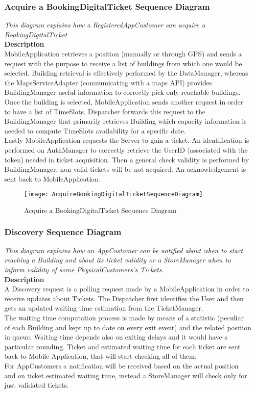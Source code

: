 \subsubsection{Acquire a BookingDigitalTicket Sequence Diagram}
\textit{This diagram explains how a RegisteredAppCustomer can acquire a BookingDigitalTicket\\}
\textbf{Description\\}
MobileApplication retrieves a position (manually or through GPS) and sends a request with the purpose to receive a list of buildings from which one would be selected.
Building retrieval is effectively performed by the DataManager, whereas the MapsServiceAdapter (communicating with a maps API) provides BuildingManager useful information to correctly pick only reachable buildings.\\
Once the building is selected, MobileApplication sends another request in order to have a list of TimeSlots. Dispatcher forwards this request to the BuildingManager that primarily retrieves Building which capacity information is needed to compute TimeSlots availability for a specific date.\\
Lastly MobileApplication requests the Server to gain a ticket. An identification is performed on AuthManager to correctly retrieve the UserID (associated with the token) needed in ticket acquisition. Then a general check validity is performed by BuildingManager, non valid tickets will be not acquired. An acknowledgement is sent back to MobileApplication.

\begin{figure}[H]
 \centering
 \texttt{[image: AcquireBookingDigitalTicketSequenceDiagram]}
 \caption{ Acquire a BookingDigitalTicket Sequence Diagram}
 \end{figure}

\newpage
\subsubsection{Discovery Sequence Diagram}
\textit{This diagram explains how an AppCustomer can be notified about when to start reaching a Building and about its ticket validity or a StoreManager when to inform validity of some PhysicalCustomers’s Tickets.\\}
\textbf{Description\\}
A Discovery request is a polling request made by a MobileApplication in order to receive updates about Tickets. The Dispatcher first identifies the User and then gets an updated waiting time estimation from the TicketManager.\\
The waiting time computation process is made by means of a statistic (peculiar of each Building and kept up to date on every exit event) and the related position in queue. Waiting time depends also on exiting delays and it would have a particular rounding.
Ticket and estimated waiting time for each ticket are sent back to Mobile Application, that will start checking all of them.\\
For AppCustomers a notification will be received based on the actual position and on ticket estimated waiting time, instead a StoreManager will check only for just validated tickets.
\\


